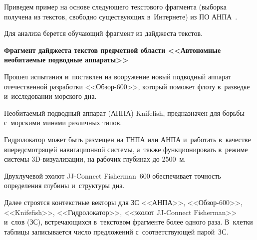 \begin{multicols}{2}
     Приведем пример на основе следующего текстового фрагмента
(выборка получена из текстов, свободно существующих в~Интернете) из
ПО \mbox{АНПА}~\cite{32-koz}.

     Для анализа берется обучающий фрагмент из дайджеста текстов.

           \smallskip

      \textbf{Фрагмент дайджеста текстов предметной области <<Автономные необитаемые подводные аппараты>>}

      \smallskip


    {\sf Прошел испытания и~поставлен на вооружение новый подводный аппарат
отечественной разработки <<Об\-зор-600>>, который поможет флоту в~разведке и~исследовании морского дна}.


   {\sf Необитаемый подводный аппарат (АНПА) Knifefish, предназначен для борьбы с~морскими минами различных типов.}

   {\sf Гидролокатор может быть размещен на ТНПА или АНПА и~работать в~качестве
впередсмотрящей навигационной системы, а~также функционировать в~режиме
системы 3D-визуализации, на рабочих глубинах до 2500~м.}

    {\sf Двухлучевой эхолот JJ-Connect Fisherman~600 обеспечивает точность определения
глубины и~структуры дна.}


    \smallskip

     Далее строятся контекстные векторы для ЗС <<АНПА>>, <<Обзор-600>>, <<Knifefish>>, <<Гидролокатор>>,
<<эхолот JJ-Connect Fisherman>> и~слов (ЗС), встречающихся в~текстовом
фрагменте более одного раза. В~клетки таб\-ли\-цы записывается число
предложений с~соответствующей парой~ЗС.





\end{multicols}
